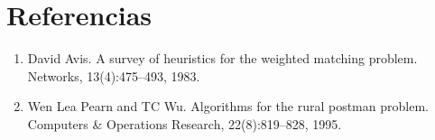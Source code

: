 \documentclass[11pt]{article}
\begin{document}
\section{Referencias}

\begin{enumerate}
   \item David Avis. A survey of heuristics for the weighted matching problem. Networks,
   13(4):475–493, 1983.
   \item Wen Lea Pearn and TC Wu. Algorithms for the rural postman problem. Computers \& Operations Research, 22(8):819–828, 1995.
\end{enumerate}
\end{document}
